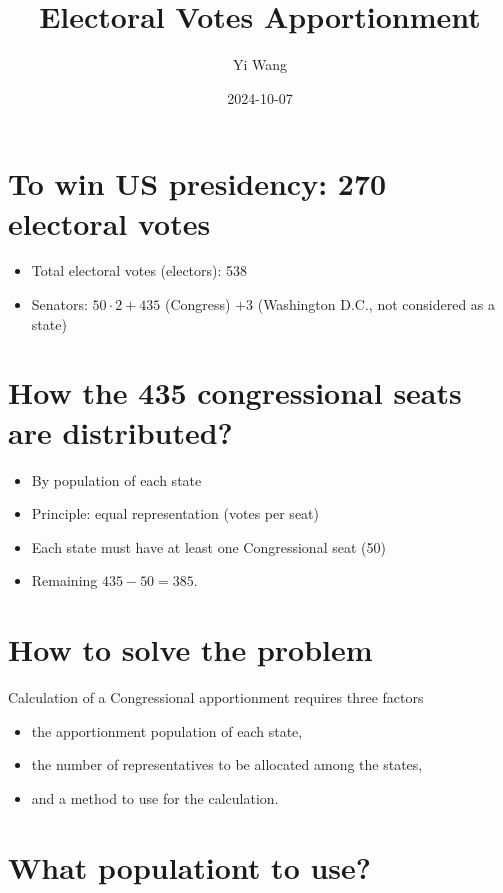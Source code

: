 \documentclass[
  letterpaper,
  DIV=11,
  numbers=noendperiod]{scrreprt}
\title{Electoral Votes Apportionment}
\author{Yi Wang}
\date{2024-10-07}
\providecommand{\tightlist}{%
  \setlength{\itemsep}{0pt}\setlength{\parskip}{0pt}}\usepackage{longtable,booktabs,array}
\begin{document}
\maketitle
\section{To win US presidency: 270 electoral
votes}\label{to-win-us-presidency-270-electoral-votes}

\begin{itemize}
\item
  Total electoral votes (electors): 538
\item
  Senators: \(50 \cdot 2 + 435\) (Congress) \(+ 3\) (Washington D.C.,
  not considered as a state)
\end{itemize}

\section{How the 435 congressional seats are
distributed?}\label{how-the-435-congressional-seats-are-distributed}

\begin{itemize}
\item
  By population of each state
\item
  Principle: equal representation (votes per seat)
\item
  Each state must have at least one Congressional seat (50)
\item
  Remaining \(435-50= 385\).
\end{itemize}

\section{How to solve the problem}\label{how-to-solve-the-problem}

Calculation of a Congressional apportionment requires three factors

\begin{itemize}
\tightlist
\item
  the apportionment population of each state,
\item
  the number of representatives to be allocated among the states,
\item
  and a method to use for the calculation.
\end{itemize}

\section{What populationt to use?}\label{what-populationt-to-use}
\end{document}
